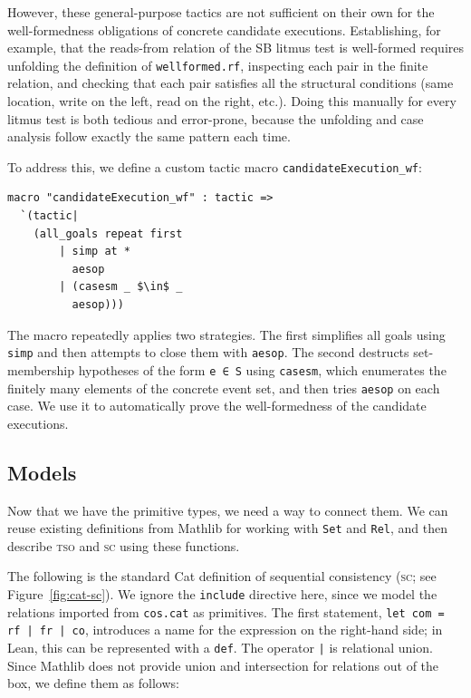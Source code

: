 However, these general-purpose tactics are not sufficient on their own for the well-formedness obligations of concrete candidate executions. Establishing, for example, that the reads-from relation of the SB litmus test is well-formed requires unfolding the definition of \texttt{wellformed.rf}, inspecting each pair in the finite relation, and checking that each pair satisfies all the structural conditions (same location, write on the left, read on the right, etc.). Doing this manually for every litmus test is both tedious and error-prone, because the unfolding and case analysis follow exactly the same pattern each time.

To address this, we define a custom tactic macro \texttt{candidateExecution\_wf}:

\begin{lstlisting}[mathescape=true]
macro "candidateExecution_wf" : tactic =>
  `(tactic|
    (all_goals repeat first
        | simp at *
          aesop
        | (casesm _ $\in$ _
          aesop)))
\end{lstlisting}

The macro repeatedly applies two strategies. The first simplifies all goals using \texttt{simp} and then attempts to close them with \texttt{aesop}. The second destructs set-membership hypotheses of the form \texttt{e ∈ S} using \texttt{casesm}, which enumerates the finitely many elements of the concrete event set, and then tries \texttt{aesop} on each case. We use it to automatically prove the well-formedness of the candidate executions.

\subsection{Models}
Now that we have the primitive types, we need a way to connect them. We can reuse existing definitions from Mathlib for working with \texttt{Set} and \texttt{Rel}, and then describe \textsc{tso} and \textsc{sc} using these functions.

The following is the standard Cat definition of sequential consistency (\textsc{sc}; see Figure~\ref{fig:cat-sc}). We ignore the \texttt{include} directive here, since we model the relations imported from \texttt{cos.cat} as primitives. The first statement, \texttt{let com = rf | fr | co}, introduces a name for the expression on the right-hand side; in Lean, this can be represented with a \texttt{def}. The operator \texttt{|} is relational union. Since Mathlib does not provide union and intersection for relations out of the box, we define them as follows:

